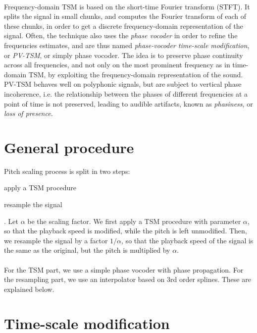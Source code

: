 \documentclass[letterpaper]{article}
\begin{document}
\paragraph{} Frequency-domain TSM is based on the short-time Fourier transform
(STFT). It splits the signal in small chunks, and computes the Fourier transform
of each of these chunks, in order to get a discrete frequency-domain
representation of the signal. Often, the technique also uses the \emph{phase
vocoder} in order to refine the frequencies estimates, and are thus named
\emph{phase-vocoder time-scale modification}, or \emph{PV-TSM}, or simply phase
vocoder. The idea is to preserve phase continuity across all frequencies, and
not only on the most prominent frequency as in time-domain TSM, by exploiting
the frequency-domain representation of the sound. PV-TSM behaves well on
polyphonic signals, but are subject to vertical phase incoherence, i.e. the
relationship between the phases of different frequencies at a point of time is
not preserved, leading to audible artifacts, known as \emph{phasiness}, or
\emph{loss of presence}.

\section{General procedure}
Pitch scaling process is split in two steps: \begin{enumerate*}[label=\arabic*)]
\item apply a TSM procedure \item resample the signal\end{enumerate*}. Let
\(\alpha\) be the scaling factor. We first apply a TSM procedure with parameter
\(\alpha\), so that the playback speed is modified, while the pitch is left
unmodified. Then, we resample the signal by a factor \(1/\alpha\), so that the
playback speed of the signal is the same as the original, but the pitch is
multiplied by \(\alpha\).

\paragraph{}
For the TSM part, we use a simple phase vocoder with phase propagation. For the
resampling part, we use an interpolator based on 3rd order splines. These are
explained below.

\section{Time-scale modification}
\end{document}
